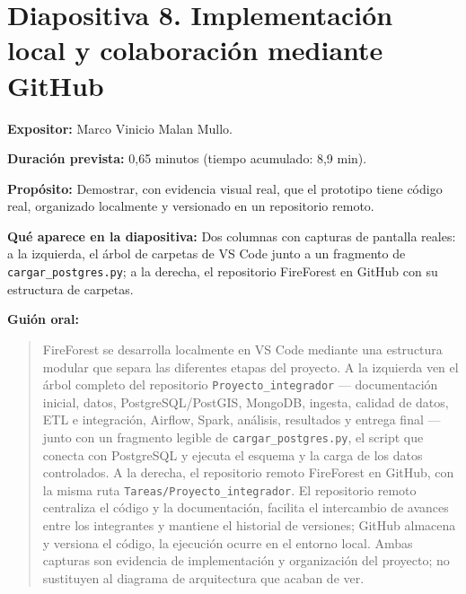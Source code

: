 \documentclass[11pt,a4paper]{article}
\newcommand{\campo}[2]{\par\medskip\noindent\textbf{#1:} #2\par}
\newenvironment{guionoral}{%
  \medskip\noindent\textbf{Gui\'on oral:}\par\smallskip
  \begin{quote}\small
}{%
  \end{quote}
}
\newcommand{\separadordiapositiva}{\bigskip\noindent{\color{Tierra!60}\hrulefill}\bigskip}
\begin{document}
\separadordiapositiva

\section*{Diapositiva 8. Implementaci\'on local y colaboraci\'on mediante GitHub}

\campo{Expositor}{Marco Vinicio Malan Mullo.}
\campo{Duraci\'on prevista}{0,65 minutos (tiempo acumulado: 8,9 min).}
\campo{Prop\'osito}{Demostrar, con evidencia visual real, que el
prototipo tiene c\'odigo real, organizado localmente y versionado en un
repositorio remoto.}
\campo{Qu\'e aparece en la diapositiva}{Dos columnas con capturas de
pantalla reales: a la izquierda, el \'arbol de carpetas de VS Code
junto a un fragmento de \texttt{cargar\_postgres.py}; a la derecha, el
repositorio FireForest en GitHub con su estructura de carpetas.}

\begin{guionoral}
FireForest se desarrolla localmente en VS Code mediante una estructura
modular que separa las diferentes etapas del proyecto. A la izquierda
ven el \'arbol completo del repositorio
\texttt{Proyecto\-\_integrador} --- documentaci\'on inicial, datos,
PostgreSQL/PostGIS, MongoDB,
ingesta, calidad de datos, ETL e integraci\'on, Airflow, Spark,
an\'alisis, resultados y entrega final --- junto con un fragmento
legible de \texttt{cargar\_postgres.py}, el script que conecta con
PostgreSQL y ejecuta el esquema y la carga de los datos controlados. A
la derecha, el repositorio remoto FireForest en GitHub, con la misma
ruta \texttt{Tareas/Proyecto\_integrador}. El repositorio remoto
centraliza el c\'odigo y la documentaci\'on, facilita el intercambio de
avances entre los integrantes y mantiene el historial de versiones;
GitHub almacena y versiona el c\'odigo, la ejecuci\'on ocurre en el
entorno local. Ambas capturas son evidencia de implementaci\'on y
organizaci\'on del proyecto; no sustituyen al diagrama de arquitectura
que acaban de ver.
\end{guionoral}
\end{document}
